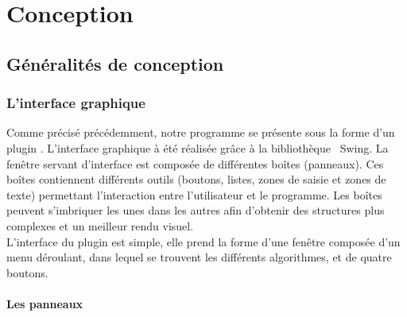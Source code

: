 
\newcommand{\black}{\color{black}}
\newcommand{\blue}{\color{blue}}
\chapter{Conception}

\section{Généralités de conception}
\subsection{L'interface graphique}
Comme précisé précédemment, notre programme se présente sous la forme d'un plugin \imj . L'interface graphique à été réalisée grâce à la bibliothèque  \java ~Swing. %
La fenêtre servant d'interface est composée de différentes boîtes (panneaux). Ces boîtes contiennent différents outils (boutons, listes, zones de saisie et zones de texte) permettant l'interaction entre l'utilisateur et le programme. Les boîtes peuvent s'imbriquer les unes dans les autres afin d'obtenir des structures plus complexes et un meilleur rendu visuel. \\
L'interface du plugin est simple, elle prend la forme d'une fenêtre composée d'un menu déroulant, dans lequel se trouvent les différents algorithmes, et de quatre boutons. 

\subsubsection{Les panneaux}

